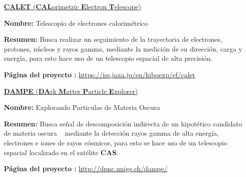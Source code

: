 \href{https://en.wikipedia.org/wiki/Calorimetric_Electron_Telescope}{\textbf{CALET} (\textbf{CAL}orimetric \textbf{E}lectron \textbf{T}elescope)}
\begin{itemize_f}\label{calet}
\item \textbf{Nombre:} Telescopio de electrones calorimétrico
\item \textbf{Resumen:} Busca realizar un seguimiento de la trayectoria de electrones, protones, núcleos y rayos gamma, mediante la medición de su dirección, carga y energía, para esto hace uso de un telescopio espacial de alta precisión.
\item \textbf{Página del proyecto :} \href{https://iss.jaxa.jp/en/kiboexp/ef/calet/}{https://iss.jaxa.jp/\-en/\-kiboexp/\-ef/\-calet}
\end{itemize_f}


\href{https://en.wikipedia.org/wiki/Dark_Matter_Particle_Explorer}{\textbf{DAMPE} (\textbf{DA}rk \textbf{M}atter \textbf{P}article \textbf{E}xplorer)}
\begin{itemize_f}
\item \textbf{Nombre:} Explorando Particulas de Materia Oscura
\item \textbf{Resumen:} Busca señal de descomposición indirecta de un hipotético candidato de materia oscura \WIMP~  mediante la detección rayos gamma de alta energía, electrones e iones de rayos cósmicos, para esto se hace uso de un telescopio espacial localizado en el satélite \textbf{CAS}.
\item \textbf{Página del proyecto :} \href{http://dpnc.unige.ch/dampe/}{http://dpnc.unige.ch/dampe/}
\end{itemize_f}

